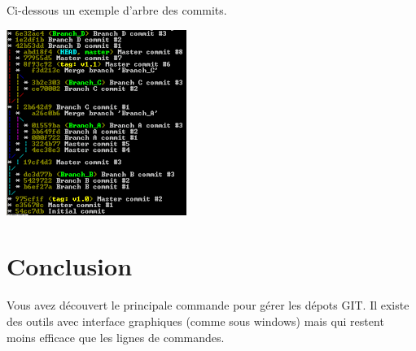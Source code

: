 \documentclass[french, 12pt]{article}%
\begin{document}
\begin{itemize}
Ci-dessous un exemple d'arbre des commits.
\begin{center}
\includegraphics[scale=0.8]{./ressource/git_tree.png}
\end{center}

\end{itemize}



\section{Conclusion}

Vous avez découvert le principale commande pour gérer les dépots GIT. Il existe des outils avec interface graphiques (comme sous windows) mais qui restent moins efficace que les lignes de commandes.
\end{document}
